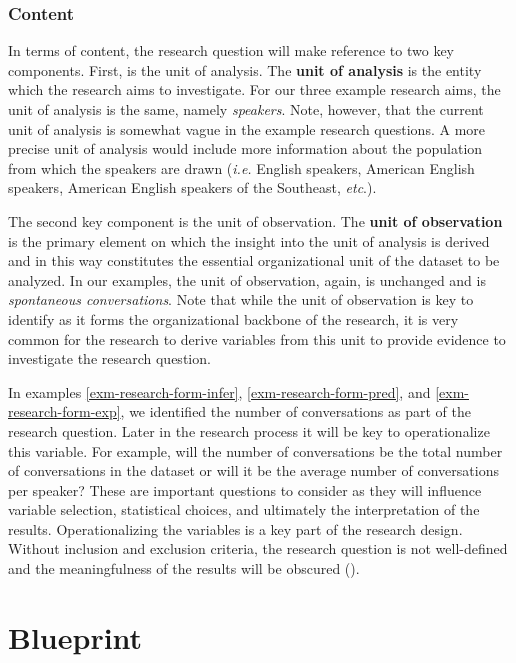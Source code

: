\documentclass[
  letterpaper,
]{book}
\theoremstyle{definition}
\theoremstyle{remark}
\begin{document}
\subsubsection{Content}\label{sec-research-question-content}

In terms of content, the research question will make reference to two
key components. First, is the unit of analysis. The \textbf{unit of
analysis} is the entity which the research aims to investigate. For our
three example research aims, the unit of analysis is the same, namely
\emph{speakers}. Note, however, that the current unit of analysis is
somewhat vague in the example research questions. A more precise unit of
analysis would include more information about the population from which
the speakers are drawn (\emph{i.e.} English speakers, American English
speakers, American English speakers of the Southeast, \emph{etc}.).

The second key component is the unit of observation. The \textbf{unit of
observation} is the primary element on which the insight into the unit
of analysis is derived and in this way constitutes the essential
organizational unit of the dataset to be analyzed. In our examples, the
unit of observation, again, is unchanged and is \emph{spontaneous
conversations}. Note that while the unit of observation is key to
identify as it forms the organizational backbone of the research, it is
very common for the research to derive variables from this unit to
provide evidence to investigate the research question.

In examples \ref{exm-research-form-infer}, \ref{exm-research-form-pred},
and \ref{exm-research-form-exp}, we identified the number of
conversations as part of the research question. Later in the research
process it will be key to operationalize this variable. For example,
will the number of conversations be the total number of conversations in
the dataset or will it be the average number of conversations per
speaker? These are important questions to consider as they will
influence variable selection, statistical choices, and ultimately the
interpretation of the results. Operationalizing the variables is a key
part of the research design. Without inclusion and exclusion criteria,
the research question is not well-defined and the meaningfulness of the
results will be obscured ().

\section{Blueprint}\label{sec-research-blueprint}
\end{document}
